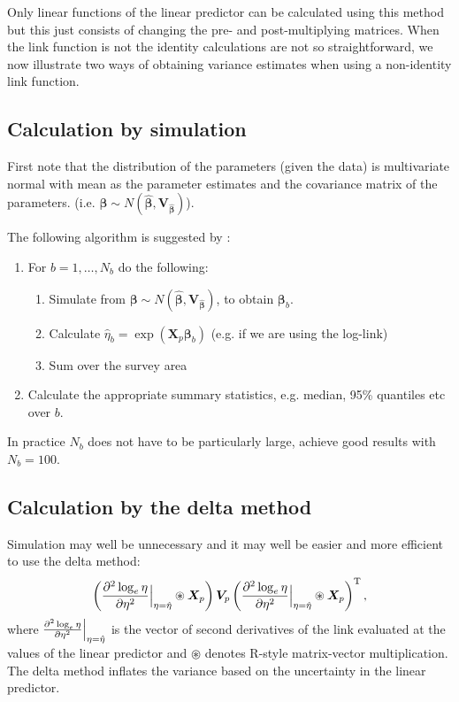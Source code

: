 \documentclass[11pt]{amsart}
\begin{document}
Only linear functions of the linear predictor can be calculated using this method but this just consists of changing the pre- and post-multiplying matrices. When the link function is not the identity calculations are not so straightforward, we now illustrate two ways of obtaining variance estimates when using a non-identity link function.

\subsection{Calculation by simulation}

First note that the distribution of the parameters (given the data) is multivariate normal with mean as the parameter estimates and the covariance matrix of the parameters. (i.e. $\bm{\beta} \sim N(\hat{\bm{\beta}}, \bm{V_{\hat{\beta}}})$). 

The following algorithm is suggested by \citep[][page 246]{Wood:2006wz}:
\begin{enumerate}
	\item For $b=1, \ldots, N_b$ do the following:
	\begin{enumerate}
    		\item Simulate from $\bm{\beta} \sim N(\hat{\bm{\beta}}, \bm{V_{\hat{\beta}}})$, to obtain $\bm{\beta}_b$.
		\item Calculate $\hat{\eta}_b = \exp(\bm{X}_{p} \bm{\beta}_b)$ (e.g. if we are using the log-link)
		\item Sum over the survey area
	\end{enumerate}
	\item  Calculate the appropriate summary statistics, e.g. median, 95\% quantiles etc over $b$.
\end{enumerate}

In practice $N_b$ does not have to be particularly large, \cite{Marra:2011eq} achieve good results with $N_b=100$.

\subsection{Calculation by the delta method}

Simulation may well be unnecessary and it may well be easier and more efficient to use the delta method:
$$
\left(\frac{\partial^2 \log_e \eta}{\partial \eta^2} \Big{\vert}_{\eta=\hat{\eta}} \circledast \bm{X}_{p} \right) \bm{V}_{p} \left( \frac{\partial^2 \log_e \eta}{\partial \eta^2} \Big{\vert}_{\eta=\hat{\eta}} \circledast \bm{X}_{p} \right)^\text{T},
$$
where $\frac{\partial^2 \log_e \eta}{\partial \eta^2} \Big{\vert}_{\eta=\hat{\eta}}$ is the vector of second derivatives of the link evaluated at the values of the linear predictor and $\circledast$ denotes \textsf{R}-style matrix-vector multiplication. The delta method inflates the variance based on the uncertainty in the linear predictor.




\end{document}
